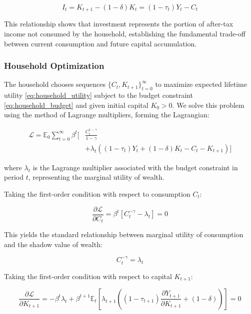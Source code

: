 \documentclass[5p,authoryear]{elsarticle}
\begin{document}
\begin{equation}
I_t = K_{t+1} - (1-\delta) K_t = (1-\tau_t) Y_t - C_t
\label{eq:investment}
\end{equation}

This relationship shows that investment represents the portion of after-tax income not consumed by the household, establishing the fundamental trade-off between current consumption and future capital accumulation.

\subsubsection{Household Optimization}

The household chooses sequences $\{C_t, K_{t+1}\}_{t=0}^{\infty}$ to maximize expected lifetime utility \eqref{eq:household_utility} subject to the budget constraint \eqref{eq:household_budget} and given initial capital $K_0 > 0$. We solve this problem using the method of Lagrange multipliers, forming the Lagrangian:

\begin{align}
\mathcal{L} = \mathbb{E}_0 \sum_{t=0}^{\infty} \beta^t \Bigg[ &\frac{C_t^{1-\gamma}}{1-\gamma} \nonumber \\
&+ \lambda_t \left( (1-\tau_t) Y_t + (1-\delta) K_t - C_t - K_{t+1} \right) \Bigg]
\label{eq:lagrangian}
\end{align}

where $\lambda_t$ is the Lagrange multiplier associated with the budget constraint in period $t$, representing the marginal utility of wealth.

Taking the first-order condition with respect to consumption $C_t$:

\begin{equation}
\frac{\partial \mathcal{L}}{\partial C_t} = \beta^t \left[ C_t^{-\gamma} - \lambda_t \right] = 0
\label{eq:foc_consumption}
\end{equation}

This yields the standard relationship between marginal utility of consumption and the shadow value of wealth:

\begin{equation}
C_t^{-\gamma} = \lambda_t
\label{eq:marginal_utility}
\end{equation}

Taking the first-order condition with respect to capital $K_{t+1}$:

\begin{equation}
\frac{\partial \mathcal{L}}{\partial K_{t+1}} = -\beta^t \lambda_t + \beta^{t+1} \mathbb{E}_t \left[ \lambda_{t+1} \left( (1-\tau_{t+1}) \frac{\partial Y_{t+1}}{\partial K_{t+1}} + (1-\delta) \right) \right] = 0
\label{eq:foc_capital}
\end{equation}
\end{document}
